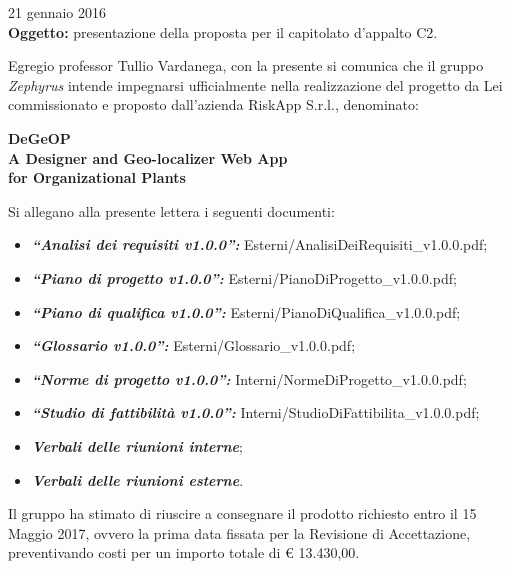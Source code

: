 \documentclass[a4paper,12pt]{letteracdp}
\begin{document}
	\begin{flushleft}
	\vspace{1cm}
	21 gennaio 2016\\
	\vspace{1cm}
	\textbf{Oggetto:} presentazione della proposta per il capitolato d'appalto C2.\\
	\vspace{1cm}

		Egregio professor Tullio Vardanega,
		con la presente si comunica che il gruppo \textit{Zephyrus} intende impegnarsi ufficialmente nella realizzazione del progetto da Lei commissionato e proposto dall'azienda RiskApp S.r.l., denominato:

		\vspace{0.5cm}
		\begin{center}
			\textbf{DeGeOP \\ A Designer and Geo-localizer Web App \\for Organizational Plants}\\
		\end{center}
		\vspace{0.5cm}

		Si allegano alla presente lettera i seguenti documenti:
		\vspace{0.5cm}
		\begin{itemize}
			\item \textit{\textbf{“Analisi dei requisiti v1.0.0”:}} Esterni/AnalisiDeiRequisiti\_v1.0.0.pdf;
			\item \textit{\textbf{“Piano di progetto v1.0.0”:}} Esterni/PianoDiProgetto\_v1.0.0.pdf;
			\item \textit{\textbf{“Piano di qualifica v1.0.0”:}} Esterni/PianoDiQualifica\_v1.0.0.pdf;
			\item \textit{\textbf{“Glossario v1.0.0”:}} Esterni/Glossario\_v1.0.0.pdf;
			\item \textit{\textbf{“Norme di progetto v1.0.0”:}} Interni/NormeDiProgetto\_v1.0.0.pdf;
			\item \textit{\textbf{“Studio di fattibilità v1.0.0”:}} Interni/StudioDiFattibilita\_v1.0.0.pdf;
			\item \textit{\textbf{Verbali delle riunioni interne}};
			\item \textit{\textbf{Verbali delle riunioni esterne}}.
		\end{itemize}

		\vspace{0.5cm}
		Il gruppo ha stimato di riuscire a consegnare il prodotto richiesto entro il 15 Maggio 2017, ovvero la prima data fissata per la Revisione di Accettazione, preventivando costi per un importo totale di \euro{} 13.430,00.
		\end{flushleft}
\end{document}
